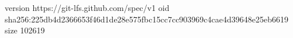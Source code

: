 version https://git-lfs.github.com/spec/v1
oid sha256:225db4d2366653f46d1de28e575fbc15cc7cc903969c4cae4d39648e25eb6619
size 102619
